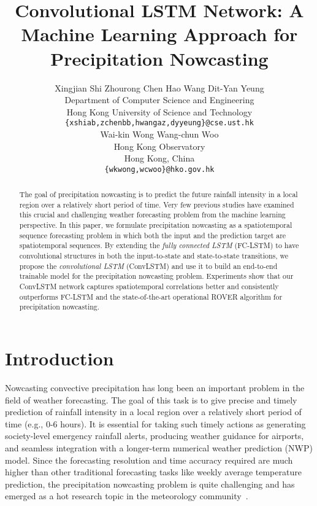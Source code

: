 \documentclass{article} \usepackage{amsmath}
\title{Convolutional LSTM Network: A Machine Learning Approach for Precipitation Nowcasting}
\author{
    Xingjian Shi \quad Zhourong Chen \quad Hao Wang \quad Dit-Yan Yeung\\
    Department of Computer Science and Engineering\\
    Hong Kong University of Science and Technology\\
    \texttt{\{xshiab,zchenbb,hwangaz,dyyeung\}@cse.ust.hk} \\
    \And
    Wai-kin Wong \quad Wang-chun Woo\\
    Hong Kong Observatory\\
    Hong Kong, China\\
    \texttt{\{wkwong,wcwoo\}@hko.gov.hk} \\
}
\begin{document}
\maketitle

\begin{abstract}
The goal of precipitation nowcasting is to predict the future rainfall intensity in a local region over a relatively short period of time. Very few previous studies have examined this crucial and challenging weather forecasting problem from the machine learning perspective. In this paper, we formulate precipitation nowcasting as a spatiotemporal sequence forecasting problem in which both the input and the prediction target are spatiotemporal sequences. By extending the \emph{fully connected LSTM} (FC-LSTM) to have convolutional structures in both the input-to-state and state-to-state transitions, we propose the \emph{convolutional LSTM} (ConvLSTM) and use it to build an end-to-end trainable model for the precipitation nowcasting problem. Experiments show that our ConvLSTM network captures spatiotemporal correlations better and consistently outperforms FC-LSTM and the state-of-the-art operational ROVER algorithm for precipitation nowcasting.
\end{abstract}

\section{Introduction}

Nowcasting convective precipitation has long been an important problem in the field of weather forecasting. The goal of this task is to give precise and timely prediction of rainfall intensity in a local region over a relatively short period of time (e.g., 0-6 hours).  It is essential for taking such timely actions as generating society-level emergency rainfall alerts, producing weather guidance for airports, and seamless integration with a longer-term numerical weather prediction (NWP) model. Since the forecasting resolution and time accuracy required are much higher than other traditional forecasting tasks like weekly average temperature prediction, the precipitation nowcasting problem is quite challenging and has emerged as a hot research topic in the meteorology community~\cite{sun2014use}.
\end{document}

